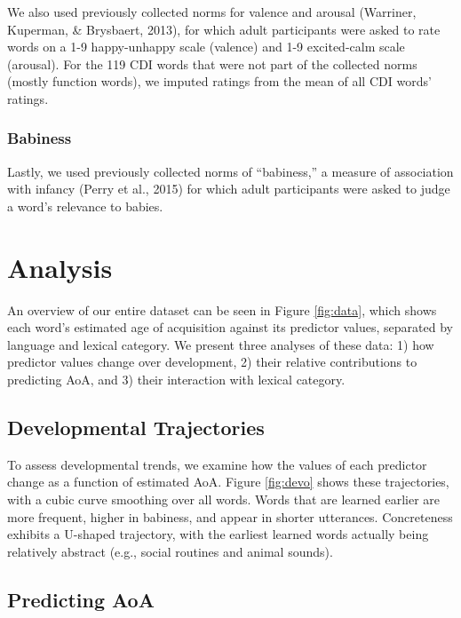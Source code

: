 \documentclass[10pt, letterpaper]{article}
\begin{document}
We also used previously collected norms for valence and arousal
(Warriner, Kuperman, \& Brysbaert, 2013), for which adult participants
were asked to rate words on a 1-9 happy-unhappy scale (valence) and 1-9
excited-calm scale (arousal). For the 119 CDI words that were not part
of the collected norms (mostly function words), we imputed ratings from
the mean of all CDI words' ratings.

\subsubsection{Babiness}\label{babiness}

Lastly, we used previously collected norms of ``babiness,'' a measure of
association with infancy (Perry et al., 2015) for which adult
participants were asked to judge a word's relevance to babies.

\section{Analysis}\label{analysis}

An overview of our entire dataset can be seen in Figure \ref{fig:data},
which shows each word's estimated age of acquisition against its
predictor values, separated by language and lexical category. We present
three analyses of these data: 1) how predictor values change over
development, 2) their relative contributions to predicting AoA, and 3)
their interaction with lexical category.

\subsection{Developmental
Trajectories}\label{developmental-trajectories}

To assess developmental trends, we examine how the values of each
predictor change as a function of estimated AoA. Figure \ref{fig:devo}
shows these trajectories, with a cubic curve smoothing over all words.
Words that are learned earlier are more frequent, higher in babiness,
and appear in shorter utterances. Concreteness exhibits a U-shaped
trajectory, with the earliest learned words actually being relatively
abstract (e.g., social routines and animal sounds).

\subsection{Predicting AoA}\label{predicting-aoa}
\end{document}
